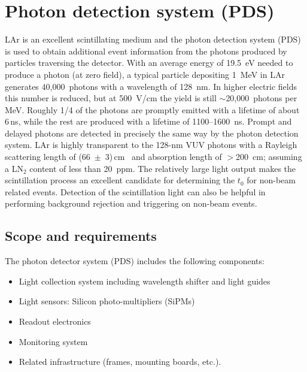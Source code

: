 
\section{Photon detection system (PDS)}
\label{sec:pd_system}

LAr is an excellent scintillating medium and the photon detection
system (PDS) is used to obtain additional event information from
the photons produced by particles traversing the detector.
 With an
average energy of 19.5~eV needed to produce a photon (at zero field),
a typical particle depositing 1~MeV in LAr generates
40,000~photons with a wavelength of 128~nm. In higher electric fields this number is 
reduced, but at 500~V/cm the yield is still $\sim$20,000~photons
per MeV. Roughly 1/4 of the photons are promptly emitted with a
lifetime of about 6\,ns, while the rest are produced with a lifetime of
1100--1600~ns. Prompt and delayed photons are detected in
  precisely the same way by the photon detection system. LAr is
highly transparent to the 128-nm VUV photons with a Rayleigh
scattering length of (66~$\pm$~3)\,cm~\cite{Rayleigh} 
and absorption
length of $>$200~cm; assuming a LN$_2$
  content of less than 20~ppm. The relatively large light output makes
the scintillation process an excellent candidate for determining the
$t_0$ for non-beam related events. Detection of the scintillation
light can also be helpful in performing background rejection and triggering on
non-beam events.

\subsection{Scope and requirements}

The photon detector system (PDS) 
includes the following components:

\begin{itemize}
\item Light collection system including wavelength shifter and light guides
\item Light sensors: Silicon photo-multipliers (SiPMs)
\item Readout electronics
\item Monitoring system
\item Related infrastructure (frames, mounting boards, etc.).
\end{itemize}


